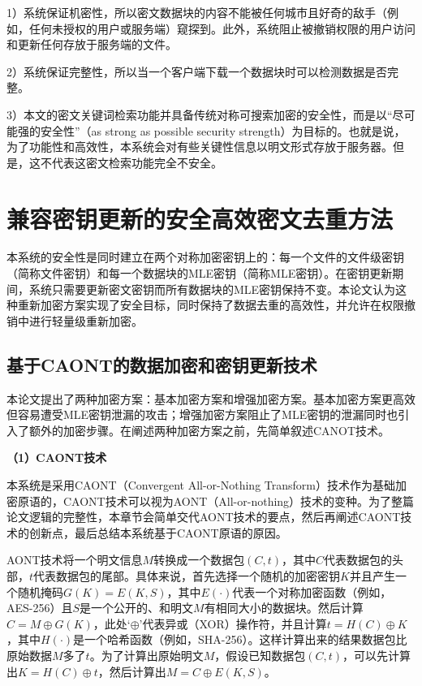 \documentclass[promaster]{thesis-uestc}
\begin{document}
1）系统保证机密性，所以密文数据块的内容不能被任何城市且好奇的敌手（例如，任何未授权的用户或服务端）窥探到。此外，系统阻止被撤销权限的用户访问和更新任何存放于服务端的文件。

2）系统保证完整性，所以当一个客户端下载一个数据块时可以检测数据是否完整。

3）本文的密文关键词检索功能并具备传统对称可搜索加密的安全性，而是以“尽可能强的安全性”（as strong as possible  security strength）为目标的。也就是说，为了功能性和高效性，本系统会对有些关键性信息以明文形式存放于服务器。但是，这不代表这密文检索功能完全不安全。


\section{兼容密钥更新的安全高效密文去重方法}\label{CAONT}
本系统的安全性是同时建立在两个对称加密密钥上的：每一个文件的文件级密钥（简称文件密钥）和每一个数据块的MLE密钥（简称MLE密钥）。在密钥更新期间，系统只需要更新密文密钥而所有数据块的MLE密钥保持不变。本论文认为这种重新加密方案实现了安全目标，同时保持了数据去重的高效性，并允许在权限撤销中进行轻量级重新加密。

\subsection{基于CAONT的数据加密和密钥更新技术}\label{基于CANOT的数据加密和密钥更新技术}
本论文提出了两种加密方案：基本加密方案和增强加密方案。基本加密方案更高效但容易遭受MLE密钥泄漏的攻击；增强加密方案阻止了MLE密钥的泄漏同时也引入了额外的加密步骤。在阐述两种加密方案之前，先简单叙述CANOT技术。

\textbf{（1）CAONT技术}

本系统是采用CAONT（Convergent All-or-Nothing Transform）技术作为基础加密原语的，CAONT技术可以视为\acrshort{AONT}（All-or-nothing）技术的变种。为了整篇论文逻辑的完整性，本章节会简单交代AONT技术的要点，然后再阐述CAONT技术的创新点，最后总结本系统基于CAONT原语的原因。

AONT技术将一个明文信息$M$转换成一个数据包$(C, t)$，其中$C$代表数据包的头部，$t$代表数据包的尾部。具体来说，首先选择一个随机的加密密钥$K$并且产生一个随机掩码$G(K) = E(K, S)$，其中$E(\cdot)$代表一个对称加密函数（例如，AES-256）且$S$是一个公开的、和明文$M$有相同大小的数据块。然后计算$C = M \oplus G(K)$，此处‘$\oplus$’代表异或（XOR）操作符，并且计算$t = H(C) \oplus K$，其中$H(\cdot)$是一个哈希函数（例如，SHA-256）。这样计算出来的结果数据包比原始数据$M$多了$t$。为了计算出原始明文$M$，假设已知数据包$(C, t)$，可以先计算出$K = H(C) \oplus t$，然后计算出$M = C \oplus E(K, S)$。
\end{document}
